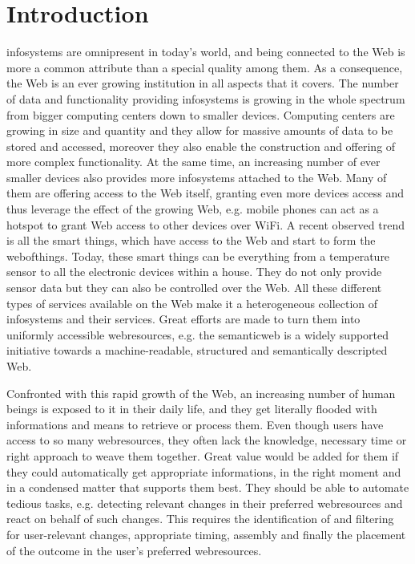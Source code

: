 
\chapter{Introduction}
\textrm{\glspl{infosystem}} are omnipresent in today's world, and being connected to the Web is more a common attribute than a special quality among them.
As a consequence, the Web is an ever growing institution in all aspects that it covers.
The number of data and functionality providing \textrm{\glspl{infosystem}} is growing in the whole spectrum from bigger computing centers down to smaller devices.
Computing centers are growing in size and quantity and they allow for massive amounts of data to be stored and accessed, moreover they also enable the construction and offering of more complex functionality.
At the same time, an increasing number of ever smaller devices also provides more \textrm{\glspl{infosystem}} attached to the Web.
Many of them are offering access to the Web itself, granting even more devices access and thus leverage the effect of the growing Web, e.g. mobile phones can act as a hotspot to grant Web access to other devices over \textrm{WiFi}.
A recent observed trend is all the smart things, which have access to the Web and start to form the \textrm{\gls{webofthings}}.
Today, these smart things can be everything from a temperature sensor to all the electronic devices within a house.
They do not only provide sensor data but they can also be controlled over the Web.
All these different types of services available on the Web make it a heterogeneous collection of \textrm{\glspl{infosystem}} and their services.
Great efforts are made to turn them into uniformly accessible \textrm{\glspl{webresource}}, e.g. the \textrm{\gls{semanticweb}} is a widely supported initiative towards a machine-readable, structured and semantically descripted Web.

Confronted with this rapid growth of the Web, an increasing number of human beings is exposed to it in their daily life, and they get literally flooded with informations and means to retrieve or process them.
Even though users have access to so many \textrm{\glspl{webresource}}, they often lack the knowledge, necessary time or right approach to weave them together.
Great value would be added for them if they could automatically get appropriate informations, in the right moment and in a condensed matter that supports them best.
They should be able to automate tedious tasks, e.g. detecting relevant changes in their preferred \textrm{\glspl{webresource}} and react on behalf of such changes.
This requires the identification of and filtering for user-relevant changes, appropriate timing, assembly and finally the placement of the outcome in the user's preferred \textrm{\glspl{webresource}}.

